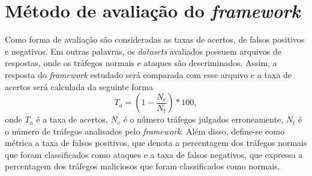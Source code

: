 \section{Método de avaliação do \textit{framework}}
Como forma de avaliação são consideradas as taxas de acertos, de falsos positivos e negativos. Em outras palavras, os \textit{datasets} avaliados possuem arquivos de respostas, onde os tráfegos normais e ataques são descriminados. Assim, a resposta do \textit{framework} estudado será comparada com esse arquivo e a taxa de acertos será calculada da seguinte forma
\begin{equation}
T_a = \left(1 - \frac{N_e}{N_t}\right)* 100,
\end{equation}
onde $T_a$ é a taxa de acertos, $N_e$ é o número tráfegos julgados erroneamente, $N_t$ é o número de tráfegos analisados pelo \textit{framework}. Além disso, define-se como métrica a taxa de falsos positivos, que denota a percentagem dos tráfegos normais que foram classificados como ataques e a taxa de falsos negativos, que expressa a percentagem dos tráfegos maliciosos que foram classificados como normais.